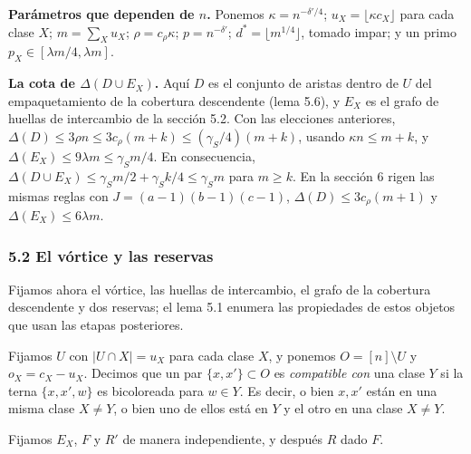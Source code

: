 \documentclass[spanish,11pt,a4paper]{article}
\begin{document}
\textbf{Parámetros que dependen de \(n\).} Ponemos \(\kappa=n^{-\delta'/4}\); \(u_X=\lfloor\kappa c_X\rfloor\) para cada clase \(X\); \(m=\sum_Xu_X\); \(\rho=c_\rho\kappa\); \(p=n^{-\delta'}\); \(d^*=\lfloor m^{1/4}\rfloor\), tomado impar; y un primo \(p_X\in[\lambda m/4,\lambda m]\).

\textbf{La cota de \(\Delta(D\cup E_X)\).} Aquí \(D\) es el conjunto de aristas dentro de \(U\) del empaquetamiento de la cobertura descendente (lema 5.6), y \(E_X\) es el grafo de huellas de intercambio de la sección 5.2. Con las elecciones anteriores, \(\Delta(D)\le3\rho n\le3c_\rho(m+k)\le(\gamma_S/4)(m+k)\), usando \(\kappa n\le m+k\), y \(\Delta(E_X)\le9\lambda m\le\gamma_S m/4\). En consecuencia, \(\Delta(D\cup E_X)\le\gamma_S m/2+\gamma_S k/4\le\gamma_S m\) para \(m\ge k\). En la sección 6 rigen las mismas reglas con \(J=(a-1)(b-1)(c-1)\), \(\Delta(D)\le3c_\rho(m+1)\) y \(\Delta(E_X)\le6\lambda m\).

\subsubsection{5.2 El vórtice y las reservas}\label{el-vuxf3rtice-y-las-reservas}

Fijamos ahora el vórtice, las huellas de intercambio, el grafo de la cobertura descendente y dos reservas; el lema 5.1 enumera las propiedades de estos objetos que usan las etapas posteriores.

Fijamos \(U\) con \(|U\cap X|=u_X\) para cada clase \(X\), y ponemos \(O=[n]\setminus U\) y \(o_X=c_X-u_X\). Decimos que un par \(\{x,x'\}\subset O\) es \emph{compatible con} una clase \(Y\) si la terna \(\{x,x',w\}\) es bicoloreada para \(w\in Y\). Es decir, o bien \(x,x'\) están en una misma clase \(X\ne Y\), o bien uno de ellos está en \(Y\) y el otro en una clase \(X\ne Y\).

Fijamos \(E_X\), \(F\) y \(R'\) de manera independiente, y después \(R\) dado \(F\).
\end{document}
